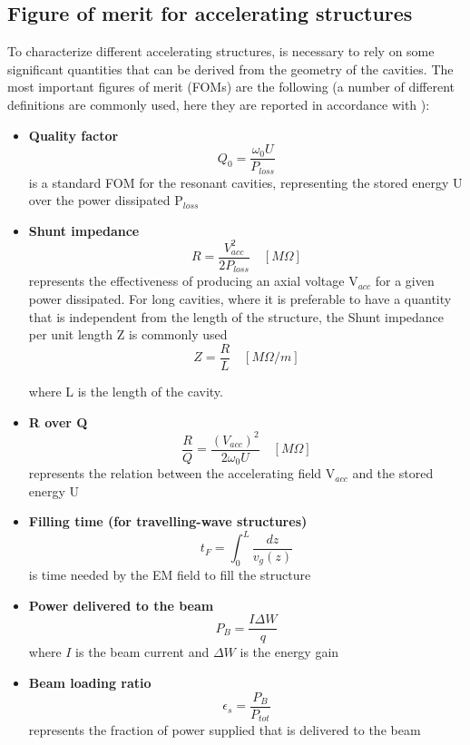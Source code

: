 \subsection[Figure of merit for accelerating structures]{Figure of merit for accelerating structures}

To characterize different accelerating structures, is necessary to rely on some significant quantities that can be derived from the geometry of the cavities. The most important figures of merit (FOMs) are the following (a number of different definitions are commonly used, here they are reported in accordance with \cite{TECKER:RFCAS}):
\begin{itemize}

\item \textbf{Quality factor} 
\begin{equation}
Q_0 = \frac{\omega_0 U}{P_{loss}} 
\end{equation}
is a standard FOM for the resonant cavities, representing the stored energy U over the power dissipated P$_{loss}$

\item \textbf{Shunt impedance} 
\begin{equation}
R = \frac{V_{acc}^2}{2P_{loss}}  \quad [M\Omega]
\end{equation}
represents the effectiveness of producing an axial voltage V$_{acc}$ for a given power dissipated. For long cavities, where it is preferable to have a quantity that is independent from the length of the structure, the Shunt impedance per unit length
 Z is commonly used 
\begin{equation}
Z = \frac{R}{L}  \quad [M\Omega / m]
\end{equation}

where L is the length of the cavity.

\item \textbf{R over Q} 
\begin{equation}
\frac{R}{Q} = \frac{(V_{acc})^2}{2\omega_0 U}  \quad [M\Omega]
\end{equation}
represents the relation between the accelerating field V$_{acc}$ and the stored energy U


\item \textbf{Filling time (for travelling-wave structures)}
\begin{equation}
t_F = \int_0^L \frac{dz}{v_g (z)}
\end{equation}
is time needed by the EM field to fill the structure

\item \textbf{Power delivered to the beam}
\begin{equation}
P_B = \frac{I \Delta W}{q}
\end{equation}
where $I$ is the beam current and $\Delta W$ is the energy gain

\item \textbf{Beam loading ratio}
\begin{equation}
\epsilon_s = \frac{P_B}{P_{tot}}
\end{equation}
represents the fraction of power supplied that is delivered to the beam

\end{itemize}


